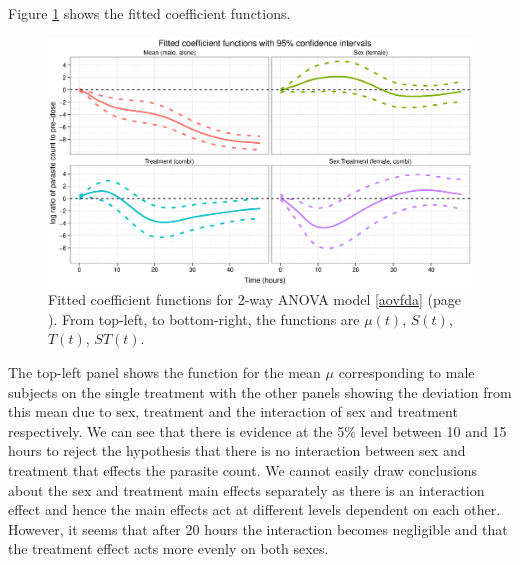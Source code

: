 Figure \ref{fdcoef} shows the fitted coefficient functions.
\begin{figure}[p]
\includegraphics[width=150mm]{fdcoef.eps} 
\caption{Fitted coefficient functions for 2-way ANOVA model \ref{aovfda} (page \pageref{aovfda}). From top-left, to bottom-right, the functions are $\mu(t)$, $S(t)$, $T(t)$, $ST(t)$.}
\label{fdcoef}
\end{figure}
The top-left panel shows the function for the mean $\mu$ corresponding to male subjects on the single treatment with the other panels showing the deviation from this mean due to sex, treatment and the interaction of sex and treatment respectively. We can see that there is evidence at the 5\% level between 10 and 15 hours to reject the hypothesis that there is no interaction between sex and treatment that effects the parasite count. We cannot easily draw conclusions about the sex and treatment main effects separately as there is an interaction effect and hence the main effects act at different levels dependent on each other. However, it seems that after 20 hours the interaction becomes negligible and that the treatment effect acts more evenly on both sexes.


